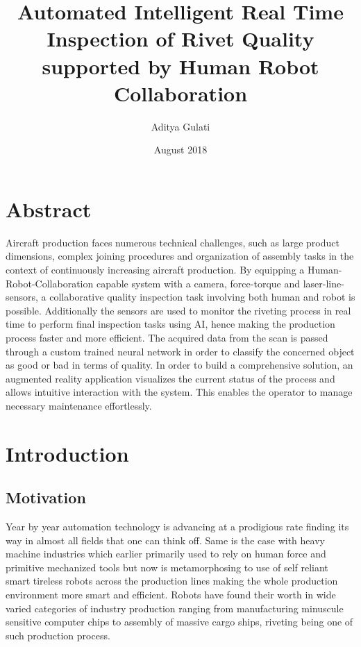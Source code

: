 \documentclass{article}
\title {Automated Intelligent Real Time Inspection of Rivet Quality supported by Human Robot Collaboration
}
\author{ Aditya Gulati}
\date{August 2018}
\begin{document}
\maketitle

\newpage

\listoffigures
\newpage


\section{Abstract}

Aircraft production faces numerous technical challenges, such as large product
dimensions, complex joining procedures and organization of assembly tasks in the
context of continuously increasing aircraft production.
By equipping a Human-Robot-Collaboration capable system with a camera, force-torque and laser-line-sensors, a collaborative quality inspection task involving both
human and robot is possible. Additionally the sensors are used to monitor the riveting
process in real time to perform final inspection tasks using AI, hence making the
production process faster and more efficient.
The acquired data from the scan is passed through a custom trained neural network in
order to classify the concerned object as good or bad in terms of quality.
In order to build a comprehensive solution, an augmented reality application visualizes
the current status of the process and allows intuitive interaction with the system. This enables the operator to manage necessary maintenance effortlessly.

\newpage




\section{Introduction}





\subsection{Motivation}


\par Year by year automation technology is advancing at a prodigious rate finding its way in almost all fields that one can think off. Same is the case with heavy machine industries which earlier primarily used to rely on human force and primitive mechanized tools but now is metamorphosing to use of self reliant smart tireless robots across the production lines making the whole production environment more smart and efficient. Robots have found their worth in wide varied categories of industry production ranging from manufacturing minuscule sensitive computer chips to assembly of massive cargo ships, riveting being one of such production process.\\
\end{document}
